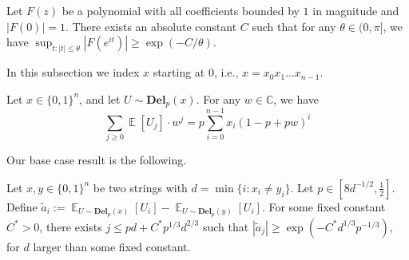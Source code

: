 \documentclass[11pt]{article}
\theoremstyle{plain}
\newcommand{\Del}[2]{\textbf{Del}_{#1}(#2)}
\newcommand{\Exp}{\operatorname*{\mathbb{E}}}
\begin{document}
\begin{fact}
    \label{fact:arcbound}
    Let $F(z)$ be a polynomial with all coefficients bounded by $1$ in magnitude and $|F(0)| = 1$. There exists an absolute constant $C$ such that for any $\theta \in (0,\pi]$, we have $\sup_{t : |t| \leq \theta} |F(e^{it})| \geq \exp(-C/\theta)$. 
\end{fact}

In this subsection we index $x$ starting at $0$, i.e., $x = x_0x_1\dots x_{n-1}$. 

\begin{lemma}
    \label{lem:mean-based}
    Let $x \in \{0,1\}^n$, and let $U \sim \mathbf{Del}_p(x)$. For any $w \in \mathbb{C}$, we have
    \begin{equation*}
        \sum_{j \geq 0} \Exp[U_j] \cdot w^j = p \sum_{i=0}^{n-1} x_i (1-p + pw)^{i} 
    \end{equation*}
\end{lemma}

Our base case result is the following.

\begin{lemma}\label{lem:base}
    Let $x,y \in \{0,1\}^n$ be two strings with $d = \min \{i :x_i \neq y_i\}$. Let $p\in[8 d^{-1/2},\frac{1}{2}]$. Define $\tilde{a}_i:=\Exp_{U\sim \Del{p}{x}}[U_i] - \Exp_{U\sim \Del{p}{y}}[U_i]$. For some fixed constant $C^*>0$, there exists $j \leq pd + C^* p^{1/3} d^{2/3}$ such that $|\tilde{a}_j| \geq \exp(-C^*d^{1/3}p^{-1/3})$, for $d$ larger than some fixed constant. 
\end{lemma}
\end{document}
